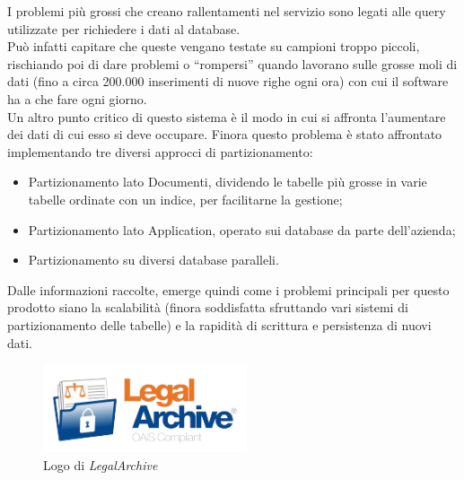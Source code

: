 I problemi più grossi che creano rallentamenti nel servizio sono legati alle query utilizzate per richiedere i dati al database.\\
Può infatti capitare che queste vengano testate su campioni troppo piccoli, rischiando poi di dare problemi o ``rompersi'' quando lavorano sulle grosse moli di dati (fino a circa 200.000 inserimenti di nuove righe ogni ora) con cui il software ha a che fare ogni giorno.\\
Un altro punto critico di questo sistema è il modo in cui si affronta l'aumentare dei dati di cui esso si deve occupare. Finora questo problema è stato affrontato implementando tre diversi approcci di partizionamento:
\begin{itemize}
    \item Partizionamento lato Documenti, dividendo le tabelle più grosse in varie tabelle ordinate con un indice, per facilitarne la gestione;
    \item Partizionamento lato Application, operato sui database da parte dell'azienda;
    \item Partizionamento su diversi database paralleli.
\end{itemize}
Dalle informazioni raccolte, emerge quindi come i problemi principali per questo prodotto siano la scalabilità (finora soddisfatta sfruttando vari sistemi di partizionamento delle tabelle) e la rapidità di scrittura e persistenza di nuovi dati.

\begin{figure}[htbp]
\begin{center}
\includegraphics[height=7em]{immagini/tecnologies-logos/logo-legal-archive.png}
\caption{Logo di \textit{LegalArchive}}
\label{fig:legal}
\end{center}
\end{figure}


